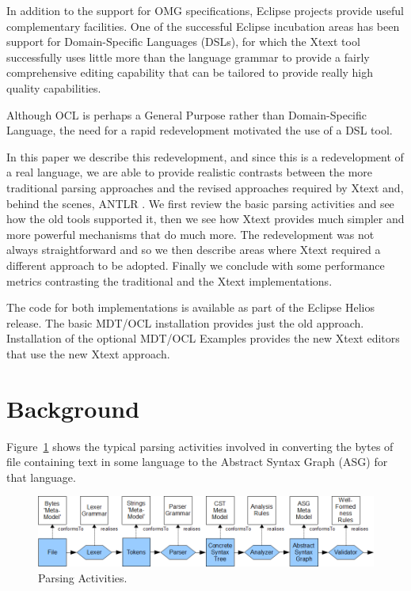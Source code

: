 \documentclass[runningheads,a4paper]{llncs}
\begin{document}
In addition to the support for OMG specifications, Eclipse projects provide useful complementary facilities. One of the successful Eclipse incubation areas has been support for Domain-Specific Languages (DSLs), for which the Xtext\cite{TMF/Xtext} tool successfully uses little more than the language grammar to provide a fairly comprehensive editing capability that can be tailored to provide really high quality capabilities.

Although OCL is perhaps a General Purpose rather than Domain-Specific Language, the need for a rapid redevelopment motivated the use of a DSL tool.

In this paper we describe this redevelopment, and since this is a redevelopment of a real language, we are able to provide realistic contrasts between the more traditional parsing approaches and the revised approaches required by Xtext and, behind the scenes, ANTLR \cite{ANTLR}. We first review the basic parsing activities and see how the old tools supported it, then we see how Xtext provides much simpler and more powerful mechanisms that do much more. The redevelopment was not always straightforward and so we then describe areas where Xtext required a different approach to be adopted. Finally we conclude with some performance metrics contrasting the traditional and the Xtext implementations.

The code for both implementations is available as part of the Eclipse Helios release. The basic MDT/OCL installation provides just the old approach. Installation of the optional MDT/OCL Examples provides the new Xtext editors that use the new Xtext approach.

\section{Background}

Figure~\ref{fig:ParsingActivities} shows the typical parsing activities involved in converting the bytes of file containing text in some language to the Abstract Syntax Graph (ASG)\cite{dragon} for that language.
	
\begin{figure}
  \begin{center}
    \includegraphics[width=4.75in]{ParsingPhases.png}
  \end{center}
  \caption{Parsing Activities.}
  \label{fig:ParsingActivities}
\end{figure}
\end{document}
